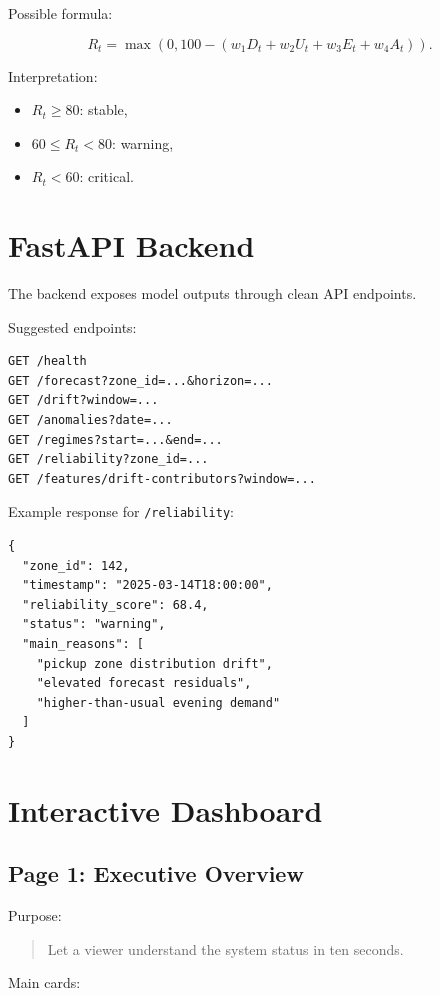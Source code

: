 \documentclass[11pt]{article}
\begin{document}
Possible formula:

\[
    R_t = \max\left(0, 100 - (w_1 D_t + w_2 U_t + w_3 E_t + w_4 A_t)\right).
\]

Interpretation:

\begin{itemize}
    \item $R_t \geq 80$: stable,
    \item $60 \leq R_t < 80$: warning,
    \item $R_t < 60$: critical.
\end{itemize}

\section{FastAPI Backend}

The backend exposes model outputs through clean API endpoints.

Suggested endpoints:

\begin{lstlisting}
GET /health
GET /forecast?zone_id=...&horizon=...
GET /drift?window=...
GET /anomalies?date=...
GET /regimes?start=...&end=...
GET /reliability?zone_id=...
GET /features/drift-contributors?window=...
\end{lstlisting}

Example response for \texttt{/reliability}:

\begin{lstlisting}
{
  "zone_id": 142,
  "timestamp": "2025-03-14T18:00:00",
  "reliability_score": 68.4,
  "status": "warning",
  "main_reasons": [
    "pickup zone distribution drift",
    "elevated forecast residuals",
    "higher-than-usual evening demand"
  ]
}
\end{lstlisting}

\section{Interactive Dashboard}

\subsection{Page 1: Executive Overview}

Purpose:

\begin{quote}
    Let a viewer understand the system status in ten seconds.
\end{quote}

Main cards:
\end{document}
